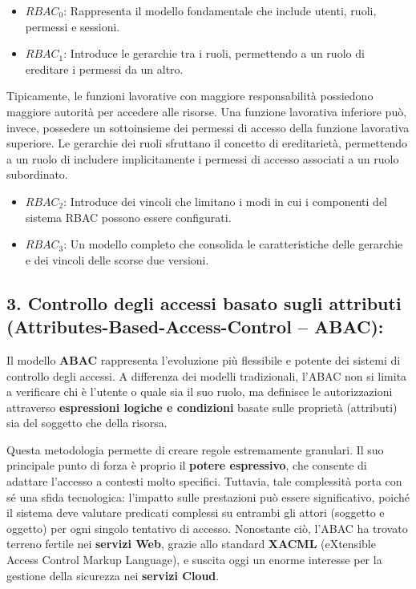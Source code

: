 \documentclass{article}
\begin{document}
\begin{itemize}
    \item $RBAC_0$: Rappresenta il modello fondamentale che include utenti, ruoli, permessi e sessioni.
    \item $RBAC_1$: Introduce le gerarchie tra i ruoli, permettendo a un ruolo di ereditare i permessi da un altro.
\end{itemize}

Tipicamente, le funzioni lavorative con maggiore responsabilità possiedono maggiore autorità per accedere alle risorse. Una funzione lavorativa inferiore può, invece, possedere un sottoinsieme dei permessi di accesso della funzione lavorativa superiore. Le gerarchie dei ruoli sfruttano il concetto di ereditarietà, permettendo a un ruolo di includere implicitamente i permessi di accesso associati a un ruolo subordinato.

\begin{itemize}
    \item $RBAC_2$: Introduce dei vincoli che limitano i modi in cui i componenti del sistema RBAC possono essere configurati.
    \item $RBAC_3$: Un modello completo che consolida le caratteristiche delle gerarchie e dei vincoli delle scorse due versioni.
\end{itemize}

\vspace{0.8cm}

\subsection*{3. Controllo degli accessi basato sugli attributi (Attributes-Based-Access-Control – ABAC):}

Il modello \textbf{ABAC} rappresenta l'evoluzione più flessibile e potente dei sistemi di controllo degli accessi. A differenza dei modelli tradizionali, l'ABAC non si limita a verificare chi è l'utente o quale sia il suo ruolo, ma definisce le autorizzazioni attraverso \textbf{espressioni logiche e condizioni} basate sulle proprietà (attributi) sia del soggetto che della risorsa.

Questa metodologia permette di creare regole estremamente granulari. Il suo principale punto di forza è proprio il \textbf{potere espressivo}, che consente di adattare l'accesso a contesti molto specifici. Tuttavia, tale complessità porta con sé una sfida tecnologica: l'impatto sulle prestazioni può essere significativo, poiché il sistema deve valutare predicati complessi su entrambi gli attori (soggetto e oggetto) per ogni singolo tentativo di accesso. Nonostante ciò, l'ABAC ha trovato terreno fertile nei \textbf{servizi Web}, grazie allo standard \textbf{XACML} (eXtensible Access Control Markup Language), e suscita oggi un enorme interesse per la gestione della sicurezza nei \textbf{servizi Cloud}.
\end{document}
